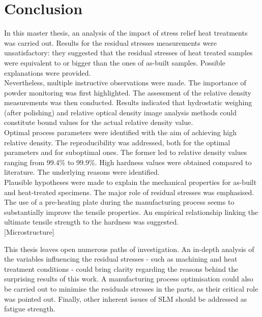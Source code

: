 \chapter{Conclusion}
\label{Chap6}
In this master thesis, an analysis of the impact of stress relief heat treatments was carried out. Results for the residual stresses measurements were unsatisfactory: they suggested that the residual stresses of heat treated samples were equivalent to or bigger than the ones of as-built samples. Possible explanations were provided.\\

Nevertheless, multiple instructive observations were made. The importance of powder monitoring was first highlighted. The assessment of the relative density measurements was then conducted. Results indicated that hydrostatic weighing (after polishing) and relative optical density image analysis methods could constitute bound values for the actual relative density value.\\

Optimal process parameters were identified with the aim of achieving high relative density. The reproducibility was addressed, both for the optimal parameters and for suboptimal ones. The former led to relative density values ranging from 99.4\% to 99.9\%. High hardness values were obtained compared to literature. The underlying reasons were identified.\\

Plausible hypotheses were made to explain the mechanical properties for as-built and heat-treated specimens. The major role of residual stresses was emphasised. The use of a pre-heating plate during the manufacturing process seems to substantially improve the tensile properties. An empirical relationship linking the ultimate tensile strength to the hardness was suggested.\\

[Microstructure]

This thesis leaves open numerous paths of investigation. An in-depth analysis of the variables influencing the residual stresses - such as machining and heat treatment conditions - could bring clarity regarding the reasons behind the surprising results of this work. A manufacturing process optimisation could also be carried out to minimise the residuals stresses in the parts, as their critical role was pointed out. Finally, other inherent issues of SLM should be addressed as fatigue strength.\\


%